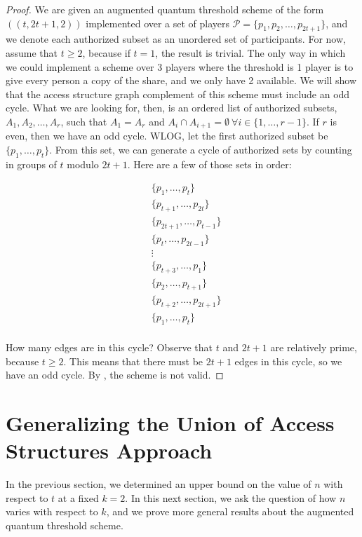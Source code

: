 \begin{proof}
    We are given an augmented quantum threshold scheme of the form $((t,2t+1,2))$ implemented over a set of players $\mathcal{P} = \{p_1,p_2,\dots,p_{2t+1}\}$, and we denote each authorized subset as an unordered set of participants. For now, assume that $t \geq 2$, because if $t=1$, the result is trivial. The only way in which we could implement a scheme over 3 players where the threshold is 1 player is to give every person a copy of the share, and we only have 2 available. We will show that the access structure graph complement of this scheme must include an odd cycle. What we are looking for, then, is an ordered list of authorized subsets, $A_1, A_2, \dots, A_r$, such that $A_1=A_r$ and $A_i \cap A_{i+1} = \emptyset \: \forall i \in \{1,\dots,r-1\}$. If $r$ is even, then we have an odd cycle. WLOG, let the first authorized subset be $\{p_1,\dots,p_{t}\}$. From this set, we can generate a cycle of authorized sets by counting in groups of $t$ modulo $2t+1$. Here are a few of those sets in order:
    
    \begin{align*}
        &\{p_1,\dots,p_{t}\} \\ 
        &\{p_{t+1},\dots,p_{2t}\} \\ 
        &\{p_{2t+1},\dots,p_{t-1}\} \\ 
        &\{p_{t},\dots,p_{2t-1}\} \\
        & \vdots \\
        &\{p_{t+3},\dots,p_{1}\} \\ 
        &\{p_{2},\dots,p_{t+1}\} \\ 
        &\{p_{t+2},\dots,p_{2t+1}\} \\ 
        &\{p_1,\dots,p_{t}\} \\ 
    \end{align*}
    
    How many edges are in this cycle? Observe that $t$ and $2t+1$ are relatively prime, because $t \geq 2$. This means that there must be $2t+1$ edges in this cycle, so we have an odd cycle. By , the scheme is not valid.
\end{proof}

\section{Generalizing the Union of Access Structures Approach}

In the previous section, we determined an upper bound on the value of $n$ with respect to $t$ at a fixed $k=2$. In this next section, we ask the question of how $n$ varies with respect to $k$, and we prove more general results about the augmented quantum threshold scheme. 

